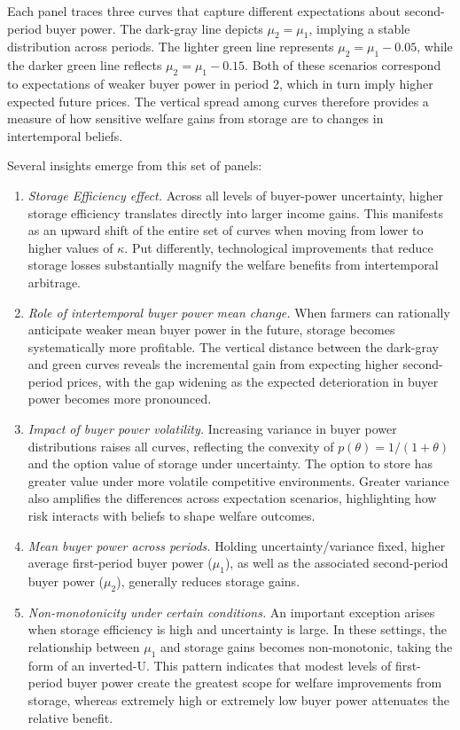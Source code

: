 Each panel traces three curves that capture different expectations about second-period buyer power. The dark-gray line depicts $\mu_2=\mu_1$, implying a stable distribution across periods. The lighter green line represents $\mu_2=\mu_1-0.05$, while the darker green line reflects $\mu_2=\mu_1-0.15$. Both of these scenarios correspond to expectations of weaker buyer power in period 2, which in turn imply higher expected future prices. The vertical spread among curves therefore provides a measure of how sensitive welfare gains from storage are to changes in intertemporal beliefs.

\medskip
\noindent 
Several insights emerge from this set of panels:

\begin{enumerate}
    \item \textit{Storage Efficiency effect.} Across all levels of buyer-power uncertainty, higher storage efficiency translates directly into larger income gains. This manifests as an upward shift of the entire set of curves when moving from lower to higher values of $\kappa$. Put differently, technological improvements that reduce storage losses substantially magnify the welfare benefits from intertemporal arbitrage.  
    \item \textit{Role of intertemporal buyer power mean change.} When farmers can rationally anticipate weaker mean buyer power in the future, storage becomes systematically more profitable. The vertical distance between the dark-gray and green curves reveals the incremental gain from expecting higher second-period prices, with the gap widening as the expected deterioration in buyer power becomes more pronounced.  
    \item \textit{Impact of buyer power volatility.} Increasing variance in buyer power distributions raises all curves, reflecting the convexity of $p(\theta)=1/(1+\theta)$ and the option value of storage under uncertainty. The option to store has greater value under more volatile competitive environments. Greater variance also amplifies the differences across expectation scenarios, highlighting how risk interacts with beliefs to shape welfare outcomes.  
    \item \textit{Mean buyer power across periods.} Holding uncertainty/variance fixed, higher average first-period buyer power ($\mu_1$), as well as the associated second-period buyer power ($\mu_2$), generally reduces storage gains.  
    \item \textit{Non-monotonicity under certain conditions.} An important exception arises when storage efficiency is high and uncertainty is large. In these settings, the relationship between $\mu_1$ and storage gains becomes non-monotonic, taking the form of an inverted-U. This pattern indicates that modest levels of first-period buyer power create the greatest scope for welfare improvements from storage, whereas extremely high or extremely low buyer power attenuates the relative benefit.
\end{enumerate}

